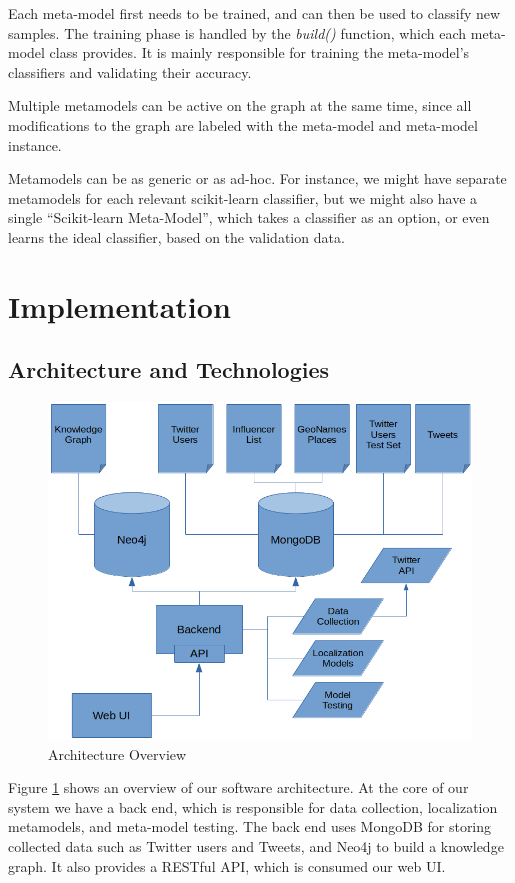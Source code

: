 \documentclass[10pt,a4paper]{article}
\begin{document}
Each meta-model first needs to be trained, and can then be used to classify new samples. The training phase is handled by the \textit{build()} function, which each meta-model class provides. It is mainly responsible for training the meta-model's classifiers and validating their accuracy.

Multiple metamodels can be active on the graph at the same time, since all modifications to the graph are labeled with the meta-model and meta-model instance.

Metamodels can be as generic or as ad-hoc. For instance, we might have separate metamodels for each relevant scikit-learn classifier, but we might also have a single “Scikit-learn Meta-Model”, which takes a classifier as an option, or even learns the ideal classifier, based on the validation data.

\section{Implementation}
\subsection{Architecture and Technologies}
\begin{figure}
	\centering
	\includegraphics[scale=0.45]{architecture_overview}
	\caption{Architecture Overview}
	\label{fig:architecture-overview}
\end{figure}

Figure \ref{fig:architecture-overview} shows an overview of our software architecture. At the core of our system we have a back end, which is responsible for data collection, localization metamodels, and meta-model testing. The back end uses MongoDB for storing collected data such as Twitter users and Tweets, and Neo4j to build a knowledge graph. It also provides a RESTful API, which is consumed our web UI.
\end{document}
